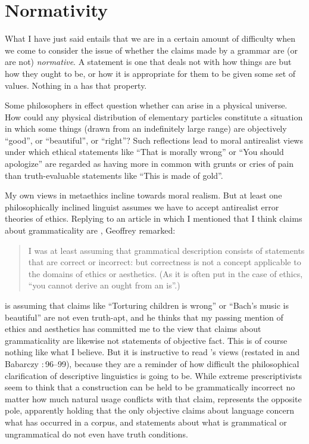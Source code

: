 \documentclass[output=paper]{langscibook}
\begin{document}
\section{Normativity}
\label{sec:pullum:normativity}

What I have just said entails that we are in a certain amount of difficulty when we come to consider the issue of whether the claims made by a grammar are (or are not) \emph{normative}.  A  statement is one that deals not with how things are but how they ought to be, or how it is appropriate for them to be given some set of values. Nothing in a  has that property.

Some philosophers in effect question whether  can arise in a physical universe. How could any physical distribution of elementary particles constitute a situation in which some things (drawn from an indefinitely large range) are objectively ``good'', or ``beautiful'', or ``right''? Such reflections lead to moral antirealist views under which ethical statements like ``That is morally wrong'' or ``You should apologize'' are regarded as having more in common with grunts or cries of pain than truth-evaluable statements like ``This is made of gold''.

My own views in metaethics incline towards moral realism. But at least one philosophically inclined linguist assumes we have to accept antirealist error theories of ethics. Replying to an article in which I mentioned that I think claims about grammaticality are  \citep{Pullum07}, Geoffrey {\Sampson} remarked:

\begin{quote}
I was at least assuming that grammatical description consists of statements that are correct or incorrect: but correctness is not a concept applicable to the domains of ethics or aesthetics. (As it is often put in the case of ethics, ``you cannot derive an ought from an is''.)
\citep[112]{Sampson07reply}
\end{quote}

{\Sampson} is assuming that claims like ``Torturing children is wrong'' or ``Bach's music is beautiful'' are not even truth-apt, and he thinks that my passing mention of ethics and aesthetics has committed me to the view that claims about grammaticality are likewise not statements of objective fact.  This is of course nothing like what I believe.  But it is instructive to read {\Sampson}'s views (restated in {\Sampson} and Babarczy \citeyear{SampBaba14}:\,96--99), because they are a reminder of how difficult the philosophical clarification of descriptive linguistics is going to be. While extreme prescriptivists seem to think that a construction can be held to be grammatically incorrect no matter how much natural usage conflicts with that claim, {\Sampson} represents the opposite pole, apparently holding that the only objective claims about language concern what has occurred in a corpus, and statements about what is grammatical or ungrammatical do not even have truth conditions.
\end{document}
